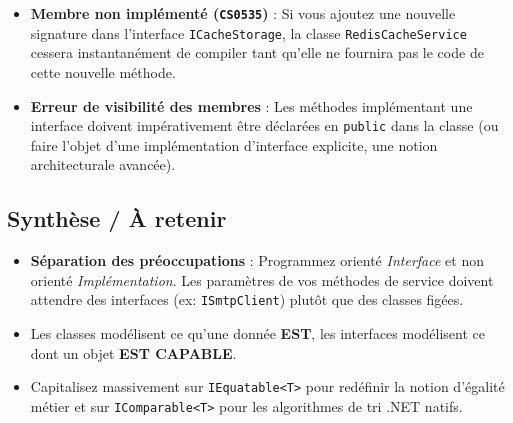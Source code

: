 \begin{tcolorbox}[colback=white,colframe=keywordcolor,title=\textbf{Pièges courants \& Erreurs de compilation}]
    \begin{itemize}
        \item \textbf{Membre non implémenté (\texttt{CS0535})} : Si vous ajoutez une nouvelle signature dans l'interface \texttt{ICacheStorage}, la classe \texttt{RedisCacheService} cessera instantanément de compiler tant qu'elle ne fournira pas le code de cette nouvelle méthode.
        \item \textbf{Erreur de visibilité des membres} : Les méthodes implémentant une interface doivent impérativement être déclarées en \texttt{public} dans la classe (ou faire l'objet d'une implémentation d'interface explicite, une notion architecturale avancée).
    \end{itemize}
\end{tcolorbox}

\subsection{Synthèse / À retenir}

\begin{itemize}
    \item \textbf{Séparation des préoccupations} : Programmez orienté \textit{Interface} et non orienté \textit{Implémentation}. Les paramètres de vos méthodes de service doivent attendre des interfaces (ex: \texttt{ISmtpClient}) plutôt que des classes figées.
    \item Les classes modélisent ce qu'une donnée \textbf{EST}, les interfaces modélisent ce dont un objet \textbf{EST CAPABLE}.
    \item Capitalisez massivement sur \texttt{IEquatable<T>} pour redéfinir la notion d'égalité métier et sur \texttt{IComparable<T>} pour les algorithmes de tri .NET natifs.
\end{itemize}
